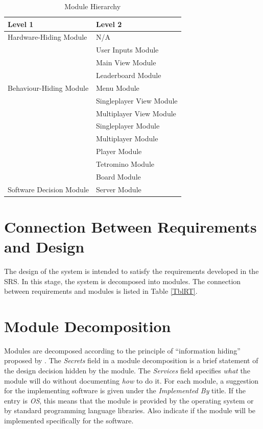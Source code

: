 \documentclass[12pt, titlepage]{article}
\begin{document}
\begin{table}[H]
\centering
\begin{tabular}{p{} p{}}
\toprule
\textbf{Level 1} & \textbf{Level 2}\\
\midrule

{Hardware-Hiding Module}& N/A\\
\midrule

\multirow{7}{0.3\textwidth}{Behaviour-Hiding Module} 
& User Inputs Module\\
& Main View Module\\
& Leaderboard Module\\
& Menu Module\\
& Singleplayer View Module\\
& Multiplayer View Module\\
& Singleplayer Module\\
& Multiplayer Module\\
& Player Module\\
& Tetromino Module\\
& Board Module\\

\midrule

Software Decision Module & Server Module\\ 

\bottomrule

\end{tabular}
\caption{Module Hierarchy}
\label{TblMH}
\end{table}

\section{Connection Between Requirements and Design} \label{SecConnection}

The design of the system is intended to satisfy the requirements developed in
the SRS. In this stage, the system is decomposed into modules. The connection
between requirements and modules is listed in Table \ref{TblRT}.

\section{Module Decomposition} \label{SecMD}

Modules are decomposed according to the principle of ``information hiding''
proposed by \citet{ParnasEtAl1984}. The \emph{Secrets} field in a module
decomposition is a brief statement of the design decision hidden by the
module. The \emph{Services} field specifies \emph{what} the module will do
without documenting \emph{how} to do it. For each module, a suggestion for the
implementing software is given under the \emph{Implemented By} title. If the
entry is \emph{OS}, this means that the module is provided by the operating
system or by standard programming language libraries.  Also indicate if the
module will be implemented specifically for the software.
\end{document}
